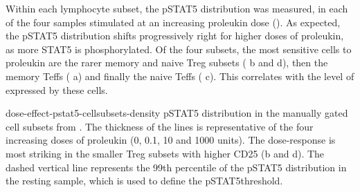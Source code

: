 Within each lymphocyte subset, the pSTAT5 distribution was measured, in each of the four samples stimulated at an increasing proleukin dose
().  
As expected, the pSTAT5 distribution shifts progressively right for higher doses of proleukin, as more STAT5 is phosphorylated.
Of the four subsets, the most sensitive cells to proleukin are the rarer memory and naive Treg subsets ( b and d),
then the memory Teffs ( a) and finally the naive Teffs ( c).
This correlates with the level of  expressed by these cells.

{dose-effect-pstat5-cellsubsets-density}
{ pSTAT5 distribution in the manually gated cell subsets from . }
{
The thickness of the lines is representative of the four increasing doses of proleukin (0, 0.1, 10 and 1000 units).
The dose-response is most striking in the smaller Treg subsets with higher CD25 (b and d).
The dashed vertical line represents the 99th percentile of the pSTAT5 distribution in the resting sample,
which is used to define the pSTAT5\positive threshold.
}

